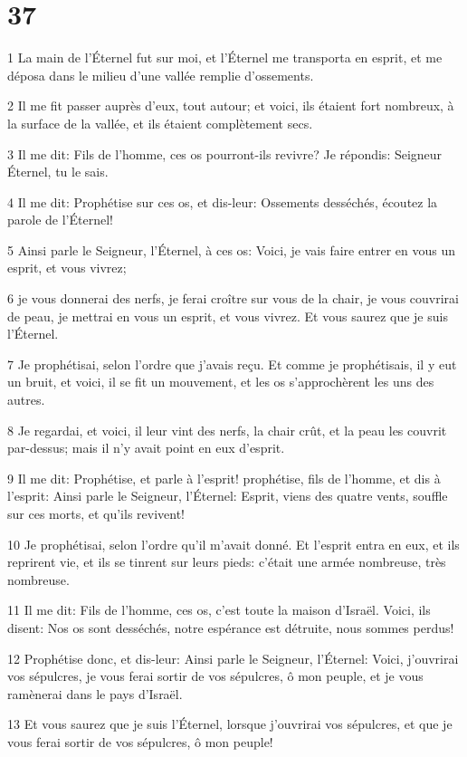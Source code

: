 \chapter{37}

\par 1 La main de l'Éternel fut sur moi, et l'Éternel me transporta en esprit, et me déposa dans le milieu d'une vallée remplie d'ossements.
\par 2 Il me fit passer auprès d'eux, tout autour; et voici, ils étaient fort nombreux, à la surface de la vallée, et ils étaient complètement secs.
\par 3 Il me dit: Fils de l'homme, ces os pourront-ils revivre? Je répondis: Seigneur Éternel, tu le sais.
\par 4 Il me dit: Prophétise sur ces os, et dis-leur: Ossements desséchés, écoutez la parole de l'Éternel!
\par 5 Ainsi parle le Seigneur, l'Éternel, à ces os: Voici, je vais faire entrer en vous un esprit, et vous vivrez;
\par 6 je vous donnerai des nerfs, je ferai croître sur vous de la chair, je vous couvrirai de peau, je mettrai en vous un esprit, et vous vivrez. Et vous saurez que je suis l'Éternel.
\par 7 Je prophétisai, selon l'ordre que j'avais reçu. Et comme je prophétisais, il y eut un bruit, et voici, il se fit un mouvement, et les os s'approchèrent les uns des autres.
\par 8 Je regardai, et voici, il leur vint des nerfs, la chair crût, et la peau les couvrit par-dessus; mais il n'y avait point en eux d'esprit.
\par 9 Il me dit: Prophétise, et parle à l'esprit! prophétise, fils de l'homme, et dis à l'esprit: Ainsi parle le Seigneur, l'Éternel: Esprit, viens des quatre vents, souffle sur ces morts, et qu'ils revivent!
\par 10 Je prophétisai, selon l'ordre qu'il m'avait donné. Et l'esprit entra en eux, et ils reprirent vie, et ils se tinrent sur leurs pieds: c'était une armée nombreuse, très nombreuse.
\par 11 Il me dit: Fils de l'homme, ces os, c'est toute la maison d'Israël. Voici, ils disent: Nos os sont desséchés, notre espérance est détruite, nous sommes perdus!
\par 12 Prophétise donc, et dis-leur: Ainsi parle le Seigneur, l'Éternel: Voici, j'ouvrirai vos sépulcres, je vous ferai sortir de vos sépulcres, ô mon peuple, et je vous ramènerai dans le pays d'Israël.
\par 13 Et vous saurez que je suis l'Éternel, lorsque j'ouvrirai vos sépulcres, et que je vous ferai sortir de vos sépulcres, ô mon peuple!
